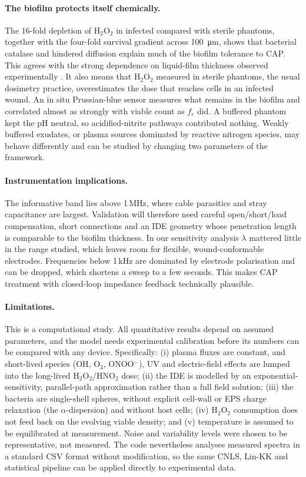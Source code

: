 \documentclass[pdflatex,sn-mathphys-num]{sn-jnl}%
\begin{document}
\paragraph{The biofilm protects itself chemically.} The 16-fold depletion of H$_2$O$_2$ in infected compared with sterile phantoms, together with the four-fold survival gradient across \SI{100}{\micro\metre}, shows that bacterial catalase and hindered diffusion explain much of the biofilm tolerance to CAP. This agrees with the strong dependence on liquid-film thickness observed experimentally \cite{hafner2018,plattfaut2021,szili2018}. It also means that H$_2$O$_2$ measured in sterile phantoms, the usual dosimetry practice, overestimates the dose that reaches cells in an infected wound. An in situ Prussian-blue sensor measures what remains in the biofilm and correlated almost as strongly with viable count as $f_c$ did. A buffered phantom kept the pH neutral, so acidified-nitrite pathways contributed nothing. Weakly buffered exudates, or plasma sources dominated by reactive nitrogen species, may behave differently and can be studied by changing two parameters of the framework.

\paragraph{Instrumentation implications.} The informative band lies above 1\,MHz, where cable parasitics and stray capacitance are largest. Validation will therefore need careful open/short/load compensation, short connections and an IDE geometry whose penetration length is comparable to the biofilm thickness. In our sensitivity analysis $\lambda$ mattered little in the range studied, which leaves room for flexible, wound-conformable electrodes. Frequencies below 1\,kHz are dominated by electrode polarisation and can be dropped, which shortens a sweep to a few seconds. This makes CAP treatment with closed-loop impedance feedback technically plausible.

\paragraph{Limitations.} This is a computational study. All quantitative results depend on assumed parameters, and the model needs experimental calibration before its numbers can be compared with any device. Specifically: (i) plasma fluxes are constant, and short-lived species (OH, O$_3$, ONOO$^-$), UV and electric-field effects are lumped into the long-lived H$_2$O$_2$/HNO$_2$ dose; (ii) the IDE is modelled by an exponential-sensitivity, parallel-path approximation rather than a full field solution; (iii) the bacteria are single-shell spheres, without explicit cell-wall or EPS charge relaxation (the $\alpha$-dispersion) and without host cells; (iv) H$_2$O$_2$ consumption does not feed back on the evolving viable density; and (v) temperature is assumed to be equilibrated at measurement. Noise and variability levels were chosen to be representative, not measured. The code nevertheless analyses measured spectra in a standard CSV format without modification, so the same CNLS, Lin-KK and statistical pipeline can be applied directly to experimental data.
\end{document}
